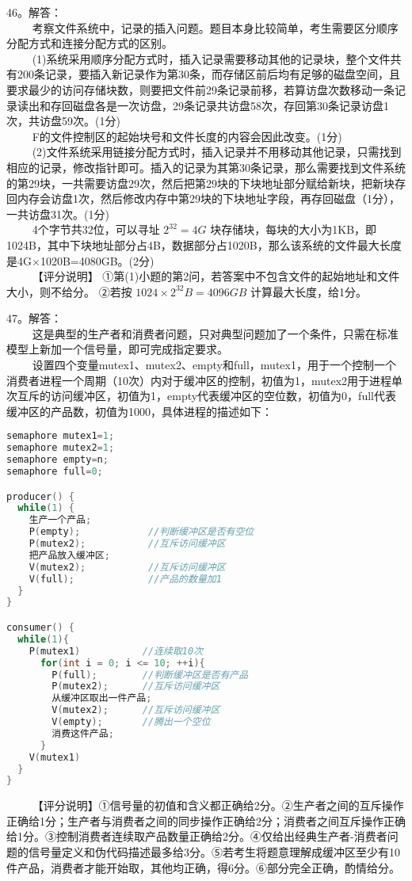 46。解答： \\
$\qquad$ 考察文件系统中，记录的插入问题。题目本身比较简单，考生需要区分顺序分配方式和连接分配方式的区别。 \\
$\qquad$ (1)系统采用顺序分配方式时，插入记录需要移动其他的记录块，整个文件共有200条记录，要插入新记录作为第30条，而存储区前后均有足够的磁盘空间，且要求最少的访问存储块数，则要把文件前29条记录前移，若算访盘次数移动一条记录读出和存回磁盘各是一次访盘，29条记录共访盘58次，存回第30条记录访盘1次，共访盘59次。(1分) \\
$\qquad$ F的文件控制区的起始块号和文件长度的内容会因此改变。(1分) \\
$\qquad$ (2)文件系统采用链接分配方式时，插入记录并不用移动其他记录，只需找到相应的记录，修改指针即可。插入的记录为其第30条记录，那么需要找到文件系统的第29块，一共需要访盘29次，然后把第29块的下块地址部分赋给新块，把新块存回内存会访盘1次，然后修改内存中第29块的下块地址字段，再存回磁盘（1分），一共访盘31次。(1分) \\
$\qquad$ 4个字节共32位，可以寻址 $2^{32}=4G$ 块存储块，每块的大小为1KB，即1024B，其中下块地址部分占4B，数据部分占1020B，那么该系统的文件最大长度是4G×1020B=4080GB。(2分) \\
$\qquad$ 【评分说明】 ①第(1)小题的第2问，若答案中不包含文件的起始地址和文件大小，则不给分。 ②若按 $1024 \times 2^{32}B=4096GB$ 计算最大长度，给1分。

47。解答： \\
$\qquad$ 这是典型的生产者和消费者问题，只对典型问题加了一个条件，只需在标准模型上新加一个信号量，即可完成指定要求。 \\
$\qquad$ 设置四个变量mutex1、mutex2、empty和full，mutex1，用于一个控制一个消费者进程一个周期（10次）内对于缓冲区的控制，初值为1，mutex2用于进程单次互斥的访问缓冲区，初值为1，empty代表缓冲区的空位数，初值为0，full代表缓冲区的产品数，初值为1000，具体进程的描述如下：
\begin{lstlisting}[language=cpp]
semaphore mutex1=1;
semaphore mutex2=1;
semaphore empty=n;
semaphore full=0;

producer() {
  while(1) {
    生产一个产品;
    P(empty);            //判断缓冲区是否有空位
    P(mutex2);           //互斥访问缓冲区
    把产品放入缓冲区;
    V(mutex2);           //互斥访问缓冲区
    V(full);             //产品的数量加1
  }
}

consumer() {
  while(1){
    P(mutex1)           //连续取10次
      for(int i = 0; i <= 10; ++i){
        P(full);        //判断缓冲区是否有产品
        P(mutex2);      //互斥访问缓冲区
        从缓冲区取出一件产品;
        V(mutex2);      //互斥访问缓冲区
        V(empty);       //腾出一个空位
        消费这件产品;
      }
    V(mutex1)
  }
}
\end{lstlisting}
$\qquad$ 【评分说明】①信号量的初值和含义都正确给2分。②生产者之间的互斥操作正确给1分；生产者与消费者之间的同步操作正确给2分；消费者之间互斥操作正确给1分。③控制消费者连续取产品数量正确给2分。④仅给出经典生产者-消费者问题的信号量定义和伪代码描述最多给3分。⑤若考生将题意理解成缓冲区至少有10件产品，消费者才能开始取，其他均正确，得6分。⑥部分完全正确，酌情给分。